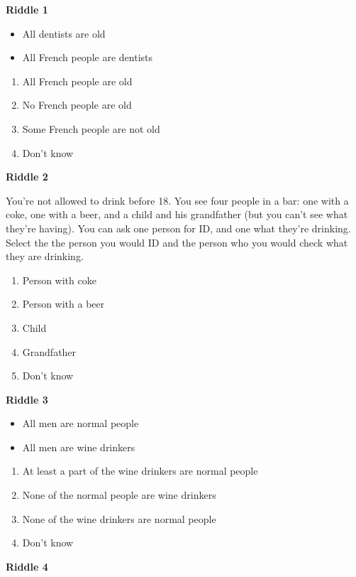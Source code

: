 \documentclass[12pt,a4paper]{report}
\begin{document}
\begin{appendices}
\begin{table}[!bp]
{\begin{minipage}{0.99\textheight}
\begin{tabular}{l*{13}{r}}
      \end{tabular}
    \end{minipage}}
\end{table}


\FloatBarrier
\textbf{Riddle 1}
\begin{itemize}
 \item All dentists are old
 \item All French people are dentists
\end{itemize}
\begin{enumerate}
  \item All French people are old
  \item No French people are old
  \item Some French people are not old
  \item Don't know
\end{enumerate}

\textbf{Riddle 2}

You're not allowed to drink before 18. You see four people in a bar: one with a coke, one with a beer, and a child and his grandfather (but you can't see what they're having). You can ask one person for ID, and one what they're drinking. Select the the person you would ID and the person who you would check what they are drinking.
\begin{enumerate}
  \item Person with coke
  \item Person with a beer
  \item Child
  \item Grandfather
  \item Don't know
\end{enumerate}


\textbf{Riddle 3}
\begin{itemize}
 \item All men are normal people 
 \item All men are wine drinkers 
\end{itemize}
\begin{enumerate}
  \item At least a part of the wine drinkers are normal people
  \item None of the normal people are wine drinkers
  \item None of the wine drinkers are normal people
  \item Don't know
\end{enumerate}

\textbf{Riddle 4}


\end{appendices}
\end{document}

